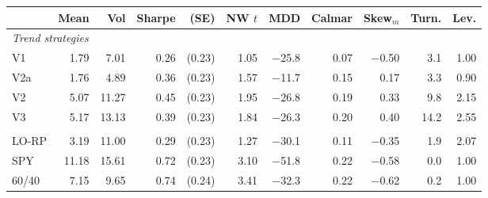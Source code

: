 \begin{tabular}{lrrrrrrrrrr}
\toprule
 & Mean & Vol & Sharpe & (SE) & NW $t$ & MDD & Calmar & Skew$_m$ & Turn. & Lev. \\
\midrule
\multicolumn{11}{l}{\textit{Trend strategies}} \\
V1 & 1.79 & 7.01 & 0.26 & (0.23) & 1.05 & $-$25.8 & 0.07 & $-$0.50 & 3.1 & 1.00 \\
V2a & 1.76 & 4.89 & 0.36 & (0.23) & 1.57 & $-$11.7 & 0.15 & 0.17 & 3.3 & 0.90 \\
V2 & 5.07 & 11.27 & 0.45 & (0.23) & 1.95 & $-$26.8 & 0.19 & 0.33 & 9.8 & 2.15 \\
V3 & 5.17 & 13.13 & 0.39 & (0.23) & 1.84 & $-$26.3 & 0.20 & 0.40 & 14.2 & 2.55 \\
\addlinespace
\multicolumn{11}{l}{\textit{Benchmarks}} \\
LO-RP & 3.19 & 11.00 & 0.29 & (0.23) & 1.27 & $-$30.1 & 0.11 & $-$0.35 & 1.9 & 2.07 \\
SPY & 11.18 & 15.61 & 0.72 & (0.23) & 3.10 & $-$51.8 & 0.22 & $-$0.58 & 0.0 & 1.00 \\
60/40 & 7.15 & 9.65 & 0.74 & (0.24) & 3.41 & $-$32.3 & 0.22 & $-$0.62 & 0.2 & 1.00 \\
\bottomrule
\end{tabular}
